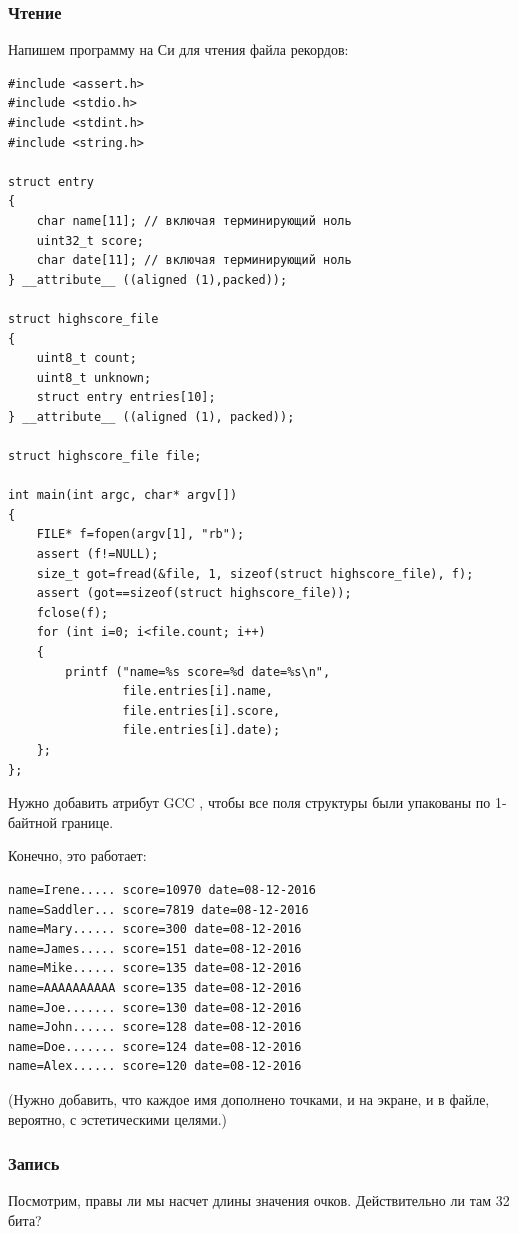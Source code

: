 \subsubsection{Чтение}

Напишем программу на Си для чтения файла рекордов:

\begin{lstlisting}[style=customc]
#include <assert.h>
#include <stdio.h>
#include <stdint.h>
#include <string.h>

struct entry
{
	char name[11]; // включая терминирующий ноль
	uint32_t score;
	char date[11]; // включая терминирующий ноль
} __attribute__ ((aligned (1),packed));

struct highscore_file
{
	uint8_t count;
	uint8_t unknown;
	struct entry entries[10];
} __attribute__ ((aligned (1), packed));

struct highscore_file file;

int main(int argc, char* argv[])
{
	FILE* f=fopen(argv[1], "rb");
	assert (f!=NULL);
	size_t got=fread(&file, 1, sizeof(struct highscore_file), f);
	assert (got==sizeof(struct highscore_file));
	fclose(f);
	for (int i=0; i<file.count; i++)
	{
		printf ("name=%s score=%d date=%s\n",
				file.entries[i].name,
				file.entries[i].score,
				file.entries[i].date);
	};
};
\end{lstlisting}

Нужно добавить атрибут GCC , чтобы все поля структуры были упакованы по 1-байтной границе.

Конечно, это работает:

\begin{lstlisting}
name=Irene..... score=10970 date=08-12-2016
name=Saddler... score=7819 date=08-12-2016
name=Mary...... score=300 date=08-12-2016
name=James..... score=151 date=08-12-2016
name=Mike...... score=135 date=08-12-2016
name=AAAAAAAAAA score=135 date=08-12-2016
name=Joe....... score=130 date=08-12-2016
name=John...... score=128 date=08-12-2016
name=Doe....... score=124 date=08-12-2016
name=Alex...... score=120 date=08-12-2016
\end{lstlisting}

(Нужно добавить, что каждое имя дополнено точками, и на экране, и в файле, вероятно, с эстетическими целями.)

\subsubsection{Запись}

Посмотрим, правы ли мы насчет длины значения очков. Действительно ли там 32 бита?

